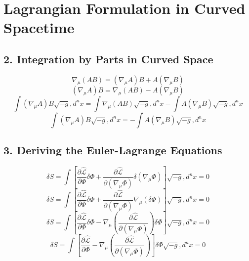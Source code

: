 \documentclass[11pt, a4paper]{report}
\begin{document}
\section*{Lagrangian Formulation in Curved Spacetime}
\subsection*{2. Integration by Parts in Curved Space}
\begin{equation}
\nabla_\mu (A B) = (\nabla_\mu A) B + A (\nabla_\mu B)
\end{equation}
\begin{equation}
(\nabla_\mu A) B = \nabla_\mu (A B) - A (\nabla_\mu B)
\end{equation}
\begin{equation}
\int (\nabla_\mu A) B \sqrt{-g} , d^n x = \int \nabla_\mu (A B) \sqrt{-g} , d^n x - \int A (\nabla_\mu B) \sqrt{-g} , d^n x
\end{equation}
\begin{equation}
\int (\nabla_\mu A) B \sqrt{-g} , d^n x = - \int A (\nabla_\mu B) \sqrt{-g} , d^n x
\end{equation}

\subsection*{3. Deriving the Euler-Lagrange Equations}
\begin{equation}
\delta S = \int \left[ \frac{\partial \hat{\mathcal{L}}}{\partial \Phi} \delta \Phi + \frac{\partial \hat{\mathcal{L}}}{\partial (\nabla_\mu \Phi)} \delta (\nabla_\mu \Phi) \right] \sqrt{-g} , d^n x = 0
\end{equation}
\begin{equation}
\delta S = \int \left[ \frac{\partial \hat{\mathcal{L}}}{\partial \Phi} \delta \Phi + \frac{\partial \hat{\mathcal{L}}}{\partial (\nabla_\mu \Phi)} \nabla_\mu (\delta \Phi) \right] \sqrt{-g} , d^n x = 0
\end{equation}
\begin{equation}
\delta S = \int \left[ \frac{\partial \hat{\mathcal{L}}}{\partial \Phi} \delta \Phi - \nabla_\mu \left( \frac{\partial \hat{\mathcal{L}}}{\partial (\nabla_\mu \Phi)} \right) \delta \Phi \right] \sqrt{-g} , d^n x = 0
\end{equation}
\begin{equation}
\delta S = \int \left[ \frac{\partial \hat{\mathcal{L}}}{\partial \Phi} - \nabla_\mu \left( \frac{\partial \hat{\mathcal{L}}}{\partial (\nabla_\mu \Phi)} \right) \right] \delta \Phi \sqrt{-g} , d^n x = 0
\end{equation}
\end{document}
